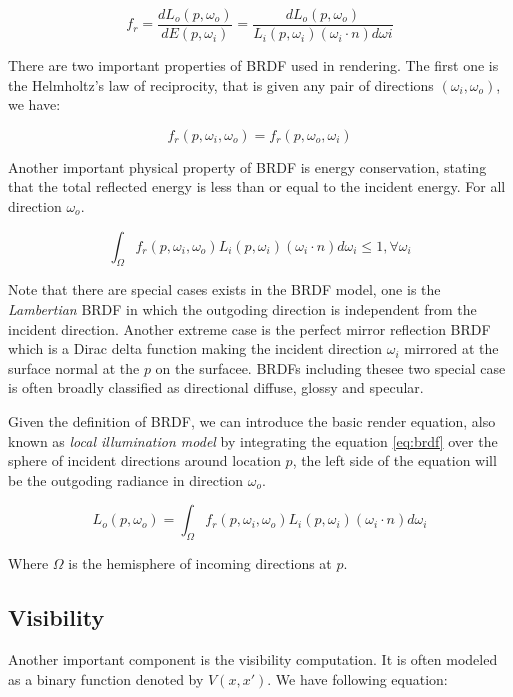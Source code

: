 \begin{equation}
f_{r} = \frac{dL_{o}(p, \omega_{o})}{dE(p, \omega_{i})} = \frac{dL_{o}(p, \omega_{o})}{L_{i}(p, \omega_{i})(\omega_{i} \cdot n)d\omega{i}}
\label{eq:brdf} 
\end{equation} 

There are two important properties of BRDF used in rendering. The first one is the Helmholtz's law of reciprocity, that is given any pair of directions \( (\omega_{i}, \omega_{o} ) \), we have: 

\begin{equation}
f_{r}(p, \omega_{i}, \omega_{o}) = f_r(p, \omega_{o}, \omega_{i})
\end{equation}

Another important physical property of BRDF is energy conservation, stating that the total reflected energy is less than or equal to the incident energy. For all direction \( \omega_{o} \).

\begin{equation}
 \int_{\Omega}f_{r}(p, \omega_{i}, \omega_{o})L_{i}(p, \omega_{i})(\omega_{i} \cdot n)d\omega_{i} \leq 1 , \forall \omega_{i}
\end{equation}

Note that there are special cases exists in the BRDF model, one is the \emph{Lambertian} BRDF in which the outgoding direction  is independent from the incident direction. Another extreme case is the perfect mirror reflection BRDF which is a Dirac delta function making the incident direction \(\omega_{i}\) mirrored at the surface normal at the \(p\) on the surfacee. BRDFs including thesee two special case is often broadly classified as directional diffuse, glossy and specular. 

Given the definition of BRDF, we can introduce the basic render equation, also known as \emph{local illumination model} by integrating the equation \ref{eq:brdf} over the sphere of incident directions around location \(p\), the left side of the equation will be the outgoding radiance in direction \(\omega_{o}\). 

\begin{equation}
L_{o}(p, \omega_{o}) = \int_{\Omega}f_{r}(p, \omega_{i}, \omega_{o})L_{i}(p, \omega_{i})(\omega_{i} \cdot n)d\omega_{i}
\label{eq:local_render_equation}
\end{equation}

Where \(\Omega\) is the hemisphere of incoming directions at \(p\).

\subsection{Visibility} 
Another important component is the visibility computation. It is often modeled as a binary function denoted by \(V(x, x')\). 
We have following equation: 

